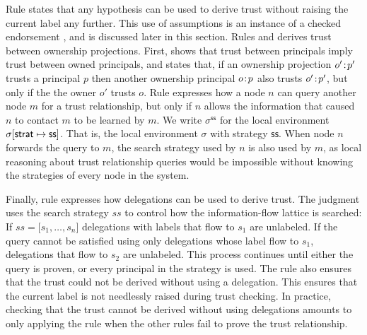 Rule  states that any hypothesis can be used to derive trust without raising the current label any further. This use of assumptions is an instance of a checked endorsement \cite{Chong:2007:SWA:1294261.1294265, DBLP:journals/corr/abs-1107-5594}, and is discussed later in this section.
Rules  and  derives trust between ownership projections. First,  shows that trust between principals imply trust between owned principals, and  states that, if an ownership projection $o'\!:\!p'$ trusts a principal $p$ then another ownership principal $o\!:\!p$ also trusts $o'\!:\!p'$, but only if the the owner $o'$ trusts $o$.
Rule  expresses how a node $n$ can query another node $m$ for a trust relationship, but only if $n$ allows the information that caused $n$ to contact $m$ to be learned by $m$. We write $\sigma^{\mathsf{ss}}$ for the local environment $\sigma \lbrack \mathsf{strat} \mapsto \mathsf{ss} \rbrack$. That is, the local environment $\sigma$ with strategy $\mathsf{ss}$. When node $n$ forwards the query to $m$, the search strategy used by $n$ is also used by $m$, as local reasoning about trust relationship queries would be impossible without knowing the strategies of every node in the system.

Finally, rule  expresses how delegations can be used to derive trust. The judgment uses the search strategy $\mathit{ss}$ to control how the information-flow lattice is searched: If $\mathit{ss} = \lbrack s_1, \dots, s_n \rbrack$ delegations with labels that flow to $s_1$ are unlabeled. If the query cannot be satisfied using only delegations whose label flow to $s_1$, delegations that flow to $s_2$ are unlabeled. This process continues until either the query is proven, or every principal in the strategy is used. The rule also ensures that the trust could not be derived without using a delegation. This ensures that the current label is not needlessly raised during trust checking. In practice, checking that the trust cannot be derived without using delegations amounts to only applying the  rule when the other rules fail to prove the trust relationship.

